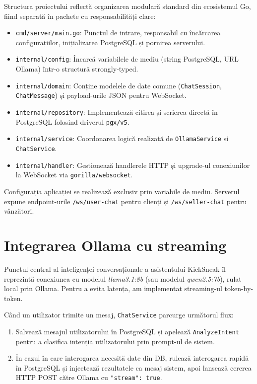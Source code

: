Structura proiectului reflectă organizarea modulară standard din ecosistemul Go, fiind separată în pachete cu responsabilități clare:
\begin{itemize}
    \item \texttt{cmd/server/main.go}: Punctul de intrare, responsabil cu încărcarea configurațiilor, inițializarea PostgreSQL și pornirea serverului.
    \item \texttt{internal/config}: Încarcă variabilele de mediu (string PostgreSQL, URL Ollama) într-o structură strongly-typed.
    \item \texttt{internal/domain}: Conține modelele de date comune (\texttt{ChatSession}, \texttt{ChatMessage}) și payload-urile JSON pentru WebSocket.
    \item \texttt{internal/repository}: Implementează citirea și scrierea directă în PostgreSQL folosind driverul \texttt{pgx/v5}.
    \item \texttt{internal/service}: Coordonarea logică realizată de \texttt{OllamaService} și \texttt{ChatService}.
    \item \texttt{internal/handler}: Gestionează handlerele HTTP și upgrade-ul conexiunilor la WebSocket via \texttt{gorilla/websocket}.
\end{itemize}

Configurația aplicației se realizează exclusiv prin variabile de mediu. Serverul expune endpoint-urile \texttt{/ws/user-chat} pentru clienți și \texttt{/ws/seller-chat} pentru vânzători.

\section{Integrarea Ollama cu streaming}

Punctul central al inteligenței conversaționale a asistentului KickSneak îl reprezintă conexiunea cu modelul \textit{llama3.1:8b} (sau modelul \textit{qwen2.5:7b}), rulat local prin Ollama. Pentru a evita latența, am implementat streaming-ul token-by-token.

Când un utilizator trimite un mesaj, \texttt{ChatService} parcurge următorul flux:
\begin{enumerate}
    \item Salvează mesajul utilizatorului în PostgreSQL și apelează \texttt{AnalyzeIntent} pentru a clasifica intenția utilizatorului prin prompt-ul de sistem.
    \item În cazul în care interogarea necesită date din DB, rulează interogarea rapidă în PostgreSQL și injectează rezultatele ca mesaj sistem, apoi lansează cererea HTTP POST către Ollama cu \texttt{"stream": true}.
\end{enumerate}

